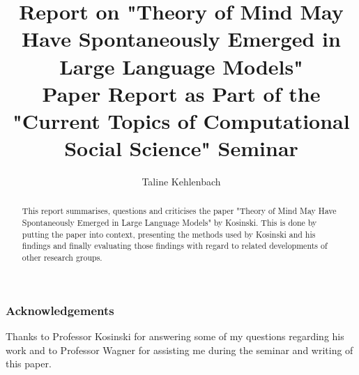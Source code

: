 \documentclass[runningheads]{llncs}
\begin{document}
%
\title{\large Report on "Theory of Mind May Have Spontaneously Emerged in Large Language Models" \\
\normalsize Paper Report as Part of the "Current Topics of Computational Social Science" Seminar}

%
%
\author{Taline Kehlenbach}
%
%
%
\maketitle              %
%
\begin{abstract}
This report summarises, questions and criticises the paper "Theory of Mind May Have Spontaneously Emerged in Large Language Models" by Kosinski. This is done by putting the paper into context, presenting the methods used by Kosinski and his findings and finally evaluating those findings with regard to related developments of other research groups.

\end{abstract}
%
%
%















\subsubsection{Acknowledgements} Thanks to Professor Kosinski for answering some of my questions regarding his work and to Professor Wagner for assisting me during the seminar and writing of this paper.

%
%
%

%



\end{document}
